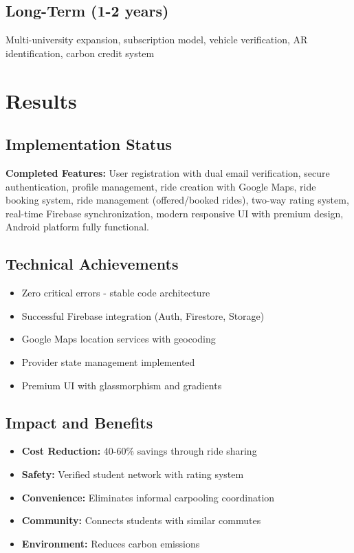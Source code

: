 \documentclass[12pt,a4paper]{article}
\begin{document}
\subsection{Long-Term (1-2 years)}
Multi-university expansion, subscription model, vehicle verification, AR identification, carbon credit system

\section{Results}

\subsection{Implementation Status}

\textbf{Completed Features:} User registration with dual email verification, secure authentication, profile management, ride creation with Google Maps, ride booking system, ride management (offered/booked rides), two-way rating system, real-time Firebase synchronization, modern responsive UI with premium design, Android platform fully functional.

\subsection{Technical Achievements}

\begin{itemize}
    \item Zero critical errors - stable code architecture
    \item Successful Firebase integration (Auth, Firestore, Storage)
    \item Google Maps location services with geocoding
    \item Provider state management implemented
    \item Premium UI with glassmorphism and gradients
\end{itemize}

\subsection{Impact and Benefits}

\begin{itemize}
    \item \textbf{Cost Reduction:} 40-60\% savings through ride sharing
    \item \textbf{Safety:} Verified student network with rating system
    \item \textbf{Convenience:} Eliminates informal carpooling coordination
    \item \textbf{Community:} Connects students with similar commutes
    \item \textbf{Environment:} Reduces carbon emissions
\end{itemize}
\end{document}
